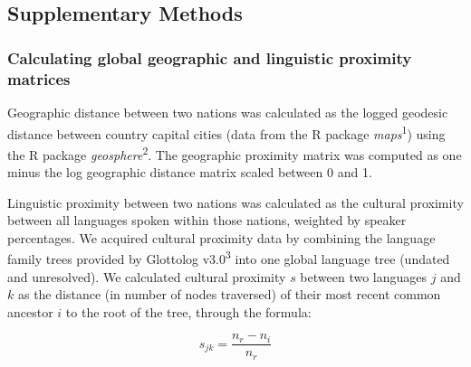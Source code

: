 \clearpage
\makeatletter
\efloat@restorefloats
\makeatother


\begin{appendix}
\renewcommand{\appendixname}{\bf{Supplementary Material}}
\renewcommand{\figurename}{Supplementary Figure}
\renewcommand{\tablename}{Supplementary Table}
\renewcommand{\thefigure}{S\arabic{figure}} \setcounter{figure}{0}
\renewcommand{\thetable}{S\arabic{table}} \setcounter{table}{0}
\renewcommand{\theequation}{S\arabic{table}} \setcounter{equation}{0}

\hypertarget{section}{%
\section{}\label{section}}

\hypertarget{supplementary-methods}{%
\subsection{Supplementary Methods}\label{supplementary-methods}}

\hypertarget{calculating-global-geographic-and-linguistic-proximity-matrices}{%
\subsubsection{Calculating global geographic and linguistic proximity
matrices}\label{calculating-global-geographic-and-linguistic-proximity-matrices}}

Geographic distance between two nations was calculated as the logged
geodesic distance between country capital cities (data from the R
package \emph{maps}\textsuperscript{1}) using the R package
\emph{geosphere}\textsuperscript{2}. The geographic proximity matrix was
computed as one minus the log geographic distance matrix scaled between
0 and 1.

Linguistic proximity between two nations was calculated as the cultural
proximity between all languages spoken within those nations, weighted by
speaker percentages. We acquired cultural proximity data by combining
the language family trees provided by Glottolog v3.0\textsuperscript{3}
into one global language tree (undated and unresolved). We calculated
cultural proximity \(s\) between two languages \(j\) and \(k\) as the
distance (in number of nodes traversed) of their most recent common
ancestor \(i\) to the root of the tree, through the formula:

\[
s_{jk} = \frac{n_{r}-n_{i}}{n_{r}}
\]


\end{appendix}
